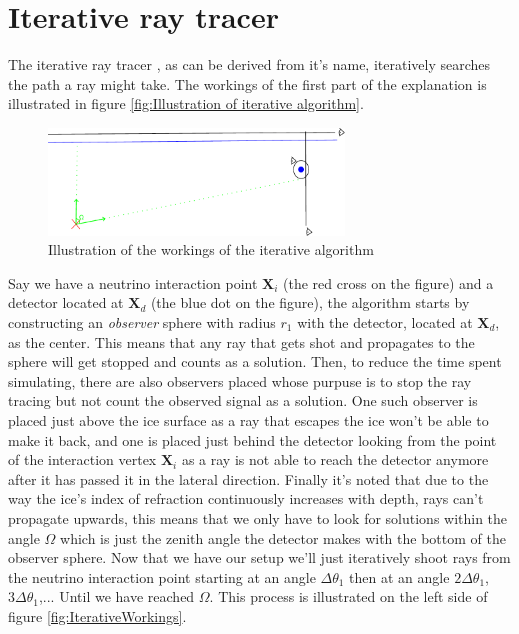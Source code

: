 \documentclass[11pt,a4paper,faculty=we,language=en,doctype=report]{cls/ugent-doc}
\begin{document}
\section{Iterative ray tracer}
\label{sec:Iterative}
The iterative ray tracer \cite{2022icrc.confE1027O}, as can be derived from
it's name, iteratively searches the path a ray might take. The workings of the
first part of the explanation is illustrated in figure \ref{fig:Illustration of
iterative algorithm}.  
\begin{figure}
  \centering
  \includegraphics[width=0.7\textwidth]{algoillu.pdf}
  \caption{Illustration of the workings of the iterative algorithm}
  \label{fig:Illustration of iterative algorithm}
\end{figure}
Say we have a neutrino interaction point $\mathbf{X}_i$
(the red cross on the figure) and a detector located at $\mathbf{X}_d$ (the
blue dot on the figure), the algorithm starts by constructing an
\textit{observer} sphere with radius $r_1$ with the detector, located at $\mathbf{X}_d$, as the
center.  This means that any ray that gets shot and propagates to the sphere
will get stopped and counts as a solution.  Then, to reduce the time spent simulating, there are also observers placed
whose purpuse is to stop the ray tracing but not count the observed signal as a solution.
One such observer is placed 
just above the ice surface as a ray that escapes the ice won't be able to make it back, and one
is placed just behind the detector looking from the point of the interaction vertex $\mathbf{X}_i$ as
a ray is not able to reach the detector anymore after it has passed it in the
lateral direction. Finally it's noted that due to the way the ice's index of refraction
continuously increases with depth, rays can't propagate upwards, this means that we only 
have to look for solutions within the angle $\Omega$ which is just the zenith angle the detector
makes with the bottom of the observer sphere.
Now that we have our setup we'll just iteratively shoot rays from the neutrino
interaction point starting at an angle $\Delta \theta_1$ then at an angle
$2\Delta \theta_1$, $3\Delta \theta_1$,... Until we have reached $\Omega$. This
process is illustrated on the left side of figure \ref{fig:IterativeWorkings}.
\end{document}
